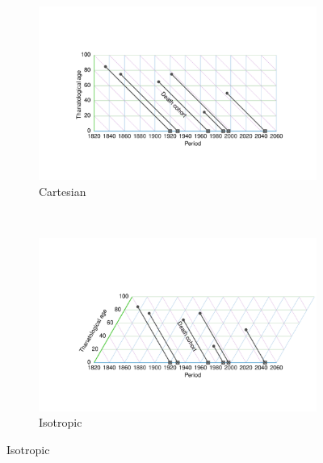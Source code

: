 \documentclass[12pt,oneside,a4paper]{article} %
\begin{document}
\begin{figure}[h!] 
\caption{A TPD diagram in two projections.}
\label{fig:TPD}
\centering
\begin{subfigure}{1.1\textwidth}
\caption{Cartesian}
\vspace{-5em}
\label{fig:TPDrt}
\includegraphics[scale=0.8]{Figures/TPDrt.pdf}
\end{subfigure}
\\\vspace{-2em}
\begin{subfigure}{1.1\textwidth}
\caption{Isotropic}
\vspace{-6em}
\label{fig:TPDeq}
\includegraphics[scale=0.8]{Figures/TPDeq.pdf}
\end{subfigure}
\end{figure} 
\end{document}
